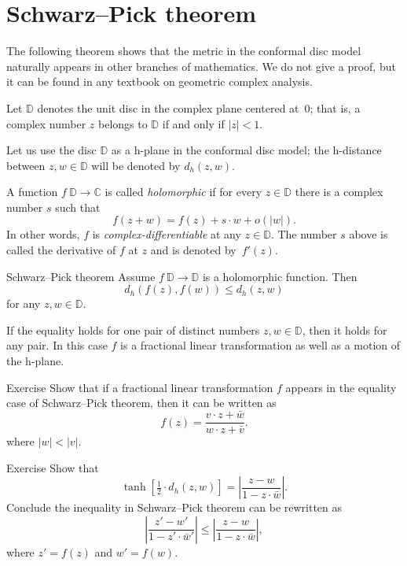 \section*{Schwarz--Pick theorem}
The following theorem shows 
that the metric in the conformal disc model naturally appears in other branches of mathematics.
We do not give a proof, but it can be found in any textbook on geometric complex analysis.

Let $\mathbb{D}$ denotes the unit disc in the complex plane centered at~$0$;
that is, a complex number $z$
belongs to $\mathbb{D}$ if and only if $|z|<1$.

Let us use the disc $\mathbb{D}$ as a h-plane in the conformal disc model;
the h-distance between $z, w\in\mathbb{D}$ will be denoted by $d_h(z,w)$.

A function $f\:\mathbb{D}\to \mathbb{C}$ is called \emph{holomorphic} if for every $z\in \mathbb{D}$
there is a complex number $s$ such that
\[f(z+w)=f(z)+s\cdot w+o(|w|).\]
In other words, $f$ is {}\emph{complex-differentiable}
at any $z\in\mathbb{D}$.
The number $s$ above is called the derivative of $f$ at $z$ and is denoted by~$f'(z)$.

\begin{thm}{Schwarz--Pick theorem}
Assume $f\: \mathbb{D}\to \mathbb{D}$ is a holomorphic function.
Then 
\[d_h(f(z),f(w))\le d_h(z,w)\]
for any $z,w\in \mathbb{D}$.

If the equality holds for one pair of distinct numbers $z,w\in \mathbb{D}$, then it holds for any pair. 
In this case $f$ is a fractional linear transformation as well as a motion of the h-plane.
\end{thm}

\begin{thm}{Exercise}\label{ex:schwarz-moebius}
Show that if a fractional linear transformation $f$ appears in the equality case of Schwarz--Pick theorem, then it can be written as 
\[f(z)=\frac{v\cdot z+\bar w}{w\cdot z+\bar v}.\]
where $|w|<|v|$.
\end{thm}


\begin{thm}{Exercise}\label{ex:schwarz-tanh}
Show that 
\[\tanh [\tfrac12\cdot d_h(z,w)]=\left|\frac{z-w}{1-z\cdot\bar w}\right|.\]
Conclude the inequality in Schwarz--Pick theorem can be rewritten as
\[\left|\frac{z'-w'}{1-z'\cdot\bar w'}\right|\le\left|\frac{z-w}{1-z\cdot\bar w}\right|,\]
where
$z'=f(z)$ and $w'=f(w)$.
\end{thm}


